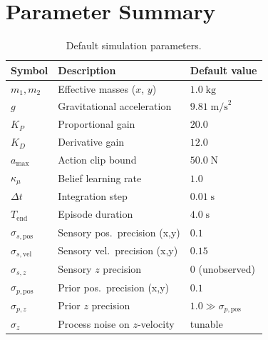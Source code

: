 \documentclass[11pt, a4paper]{article}
\begin{document}
\section{Parameter Summary}

\begin{table}[ht]
\centering
\caption{Default simulation parameters.}
\label{tab:params}
\renewcommand{\arraystretch}{1.35}
\begin{tabular}{lll}
\toprule
\textbf{Symbol} & \textbf{Description} & \textbf{Default value} \\
\midrule
$m_1, m_2$         & Effective masses ($x$, $y$)                    & $1.0\;\text{kg}$ \\
$g$                & Gravitational acceleration                       & $9.81\;\text{m/s}^2$ \\
$K_P$              & Proportional gain                                & $20.0$ \\
$K_D$              & Derivative gain                                  & $12.0$ \\
$a_{\max}$         & Action clip bound                                & $50.0\;\text{N}$ \\
$\kappa_\mu$       & Belief learning rate                             & $1.0$ \\
$\Delta t$         & Integration step                                 & $0.01\;\text{s}$ \\
$T_{\text{end}}$   & Episode duration                                 & $4.0\;\text{s}$ \\
\midrule
$\sigma_{s,\text{pos}}$ & Sensory pos.\ precision (x,y)             & $0.1$ \\
$\sigma_{s,\text{vel}}$ & Sensory vel.\ precision (x,y)             & $0.15$ \\
$\sigma_{s,z}$          & Sensory $z$ precision                     & $0$ (unobserved) \\
$\sigma_{p,\text{pos}}$ & Prior pos.\ precision (x,y)               & $0.1$ \\
$\sigma_{p,z}$          & Prior $z$ precision                       & $1.0\gg\sigma_{p,\text{pos}}$ \\
\midrule
$\sigma_z$         & Process noise on $z$-velocity                    & tunable \\
\bottomrule
\end{tabular}
\end{table}
\end{document}
